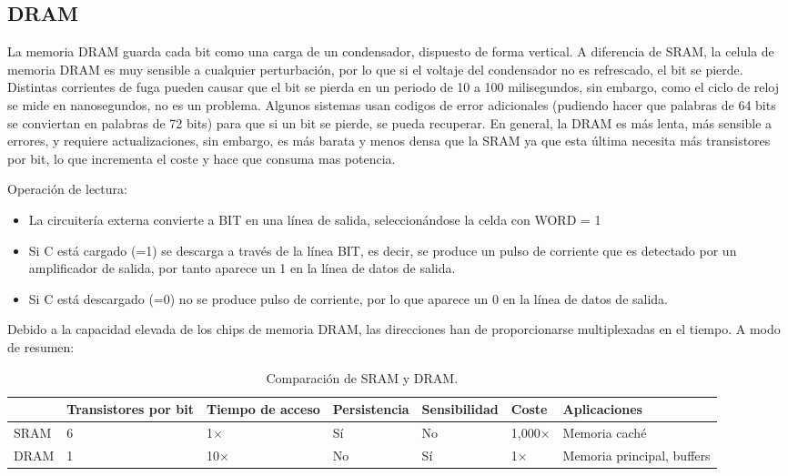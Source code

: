 \subsection{DRAM}
La memoria DRAM guarda cada bit como una carga de un condensador, dispuesto de forma vertical.
A diferencia de SRAM, la celula de memoria DRAM es muy sensible a cualquier perturbación, por lo que 
si el voltaje del condensador no es refrescado, el bit se pierde. Distintas corrientes de fuga pueden causar que el bit se pierda
en un periodo de 10 a 100 milisegundos, sin embargo, como el ciclo de reloj se mide en nanosegundos, no es un problema.
Algunos sistemas usan codigos de error adicionales (pudiendo hacer que palabras de 64 bits se conviertan en palabras de 72 bits) para
que si un bit se pierde, se pueda recuperar.
En general, la DRAM es más lenta, más sensible a errores, y requiere actualizaciones, sin embargo, es más barata y menos densa 
que la SRAM ya que esta última necesita más transistores por bit, lo que incrementa el coste y hace que consuma mas potencia.
\begin{center}
    \begin{minipage}{0.45\textwidth}
        Operación de lectura: 
        \begin{itemize}
            \item La circuitería externa convierte a BIT en una línea de salida, seleccionándose la celda con WORD = 1 
            \item Si C está cargado (=1)  se descarga a través de la línea BIT, es decir, se produce un pulso de corriente que es detectado por un amplificador de salida, por tanto aparece un 1 en la línea de datos de salida.
            \item Si C está descargado (=0) no se produce pulso de corriente, por lo que aparece un 0 en la línea de datos de salida.
        \end{itemize}
    \end{minipage}
    \begin{minipage}{0.53\textwidth}
        
    \end{minipage}
\end{center}
Debido a la capacidad elevada de los chips de memoria DRAM, las direcciones han de proporcionarse multiplexadas en el tiempo.
A modo de resumen:
\begin{table}[h!]
    \centering
    \begin{tabular}{lp{2cm}p{1.5cm}llll}
        \hline
        &Transistores por bit & Tiempo de acceso & Persistencia & Sensibilidad & Coste & Aplicaciones \\ \hline
        SRAM & 6                   & 1×              & Sí           & No           & 1,000× & Memoria caché \\
        DRAM & 1                   & 10×             & No           & Sí           & 1×     & Memoria principal, buffers\\
        \hline
    \end{tabular}
    \caption{Comparación de SRAM y DRAM.}
\end{table}


